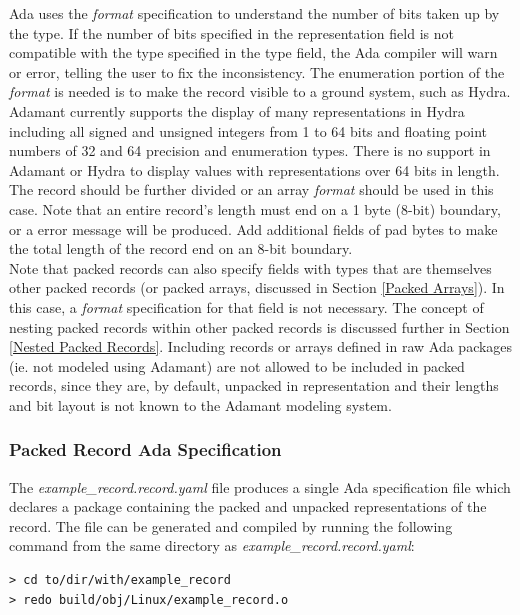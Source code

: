 Ada uses the \textit{format} specification to understand the number of bits taken up by the type. If the number of bits specified in the representation field is not compatible with the type specified in the type field, the Ada compiler will warn or error, telling the user to fix the inconsistency. The enumeration portion of the \textit{format} is needed is to make the record visible to a ground system, such as Hydra. Adamant currently supports the display of many representations in Hydra including all signed and unsigned integers from 1 to 64 bits and floating point numbers of 32 and 64 precision and enumeration types. There is no support in Adamant or Hydra to display values with representations over 64 bits in length. The record should be further divided or an array \textit{format} should be used in this case. Note that an entire record's length must end on a 1 byte (8-bit) boundary, or a error message will be produced. Add additional fields of pad bytes to make the total length of the record end on an 8-bit boundary. \\

Note that packed records can also specify fields with types that are themselves other packed records (or packed arrays, discussed in Section \ref{Packed Arrays}). In this case, a \textit{format} specification for that field is not necessary. The concept of nesting packed records within other packed records is discussed further in Section \ref{Nested Packed Records}. Including records or arrays defined in raw Ada packages (ie. not modeled using Adamant) are not allowed to be included in packed records, since they are, by default, unpacked in representation and their lengths and bit layout is not known to the Adamant modeling system.

\subsubsection{Packed Record Ada Specification} \label{Packed Record Ada Specification}

The \textit{example\_record.record.yaml} file produces a single Ada specification file which declares a package containing the packed and unpacked representations of the record. The file can be generated and compiled by running the following command from the same directory as \textit{example\_record.record.yaml}:

\vspace{5mm} %
\begin{verbatim}
> cd to/dir/with/example_record
> redo build/obj/Linux/example_record.o
\end{verbatim}
\vspace{5mm} %

